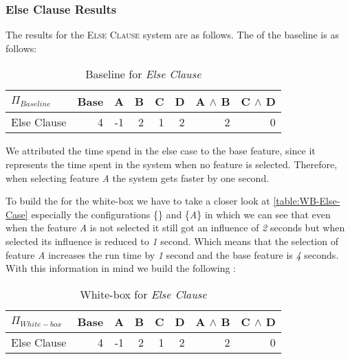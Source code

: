 \subsubsection*{Else Clause Results}

The results for the \textsc{Else Clause} system are as follows. The \perfInfluenceModel of the baseline is as follows:

\begin{table}[H]
    \centering
    \begin{tabular}{lrrrrrrr}
    \toprule
    $\Pi_{Baseline}$    & Base & A & B & C & D & A $\land$ B & C $\land$ D  \\
    \midrule
    Else Clause &   4 &  -1 &  2 &  1 &  2 &   2 &  0 \\
    \bottomrule
    \end{tabular}
    \caption{Baseline {\perfInfluenceModel} for \emph{Else Clause}}
\end{table}

We attributed the time spend in the else case to the base feature, since it represents the time spent in the system when no feature is selected.
Therefore, when selecting feature \emph{A} the system gets faster by one second. 

\begin{table}[H]
    \centering
    
\end{table}

To build the {\perfInfluenceModel} for the white-box we have to take a closer look at \autoref{table:WB-Else-Case} 
especially the configurations \{\} and \{\emph{A}\} in which we can see that even when the feature \emph{A} is 
not selected it still got an influence of \emph{2} seconds but when selected its influence is reduced to \emph{1} second.
Which means that the selection of feature \emph{A} increases the run time by \emph{1} second and the base feature is 
\emph{4} seconds.
With this information in mind we build the following {\perfInfluenceModel}:

\begin{table}[H]
    \centering
    \begin{tabular}{lrrrrrrr}
    \toprule
    $\Pi_{White-box}$    & Base & A & B & C & D & A $\land$ B & C $\land$ D  \\
    \midrule
    Else Clause &   4 &  -1 &  2 &  1 &  2 &   2 &  0 \\
    \bottomrule
    \end{tabular}
    \caption{White-box {\perfInfluenceModel} for \emph{Else Clause}}
\end{table}

